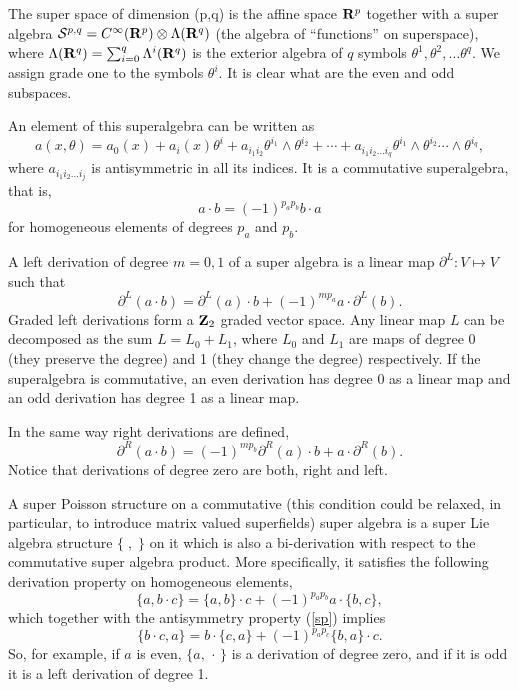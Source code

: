 \documentclass[a4paper,12pt]{article}
\begin{document}
The super space of dimension (p,q) is the affine space ${\bf R}^p$ together
with a
 super algebra $\mathcal{S}^{p,q}=C^\infty({\bf R}^p)\otimes\Lambda({\bf R}^q)$ (the
algebra
of ``functions'' on superspace), where
$\Lambda({\bf R}^q)=\sum_{i=0}^q\Lambda^i({\bf R}^q)$ is  the exterior algebra of
$q$
 symbols $\theta^1,\theta^2,\dots \theta^q$. We assign grade one to the
 symbols $\theta^i$. It is clear what are the even and odd subspaces.

 An element of this superalgebra can be written as
$$
a(x,\theta)=a_0(x)+a_i(x)\theta^i+a_{i_1i_2}\theta^{i_1}\wedge
\theta^{i_2} +\cdots + a_{i_1i_2\dots i_q}\theta^{i_1}\wedge
\theta^{i_2}\cdots \wedge\theta^{i_q},
$$
where $a_{i_1i_2\dots i_j}$ is antisymmetric in all its indices.
It is a commutative superalgebra, that is,
$$
a\cdot b=(-1)^{p_ap_b}b\cdot a
$$
for homogeneous elements of degrees $p_a$ and $p_b$. 


A left derivation of degree $m=0,1$ of  a super algebra is  a linear map 
$\partial^L:V\mapsto V$ 
such that 
$$
\partial^L(a\cdot b)=\partial^L(a)\cdot b +(-1)^{mp_a}a\cdot\partial^L(b).
$$
Graded left derivations form a ${\bf Z}_2$ graded vector space.
 Any linear map $L$  can be decomposed as the sum $L=L_0+L_1$,
where $L_0$ and $L_1$ are maps of degree 0 (they preserve the degree) and
1
 (they change the degree) respectively. If the superalgebra is
commutative,
 an even derivation has degree 0 as a linear map and an odd derivation 
has degree 1 as a linear map.

In the same way right derivations are defined,
$$
\partial^R(a\cdot b)=(-1)^{mp_b}\partial^R(a)\cdot b +a\cdot\partial^R(b).
$$
Notice that  derivations of degree zero are both, right and left.


A super Poisson structure on a commutative (this condition could be
relaxed,
 in particular, to introduce matrix valued superfields) super algebra is a
 super Lie algebra structure
 $\{\;,\;\}$ on it  which is also a bi-derivation with respect to the
 commutative super algebra product. More specifically, it satisfies the
following derivation property on homogeneous elements,
$$
\{a,b\cdot c\}=\{a,b\}\cdot c+(-1)^{p_ap_b}a\cdot \{b,c\},
$$
which together with the antisymmetry property (\ref{sp}) implies
$$
\{b\cdot c,a\}=b\cdot \{c,a\}+(-1)^{p_ap_c}\{b,a\}\cdot c.
$$
So, for example, if $a$ is even, $\{a,\,\cdot\,\}$ is a derivation of
degree zero, and if it is odd it is a left derivation of degree 1. 


 
\end{document}
